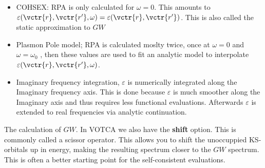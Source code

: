 \begin{itemize}
 \item COHSEX: RPA is only calculated for $\omega=0$. This amounts to $\varepsilon(\vctr{r},\vctr{r'},\omega)=\varepsilon(\vctr{r},\vctr{r'})$. This is also called the static approximation to $GW$
 \item Plasmon Pole model; RPA is calculated moslty twice, once at $\omega=0$ and $\omega=\omega_0$ , then these values are used to fit an analytic model to interpolate $\varepsilon(\vctr{r},\vctr{r'},\omega)$.
 \item Imaginary frequency integration, $\varepsilon$ is numerically integrated along the Imaginary frequency axis. This is done because $\varepsilon$ is much smoother along the Imaginary axis and thus requires less functional evaluations. Afterwards $\varepsilon$ is extended to real frequencies via analytic continuation.  
\end{itemize}

The calculation of $GW$. In VOTCA we also have the \textbf{shift} option. This is commonly called a scissor operator. This allows you to shift the unoccuppied KS-orbitals up in energy, making the resulting spectrum closer to the $GW$ spectrum. This is often a better starting point for the self-consistent evaluations.

